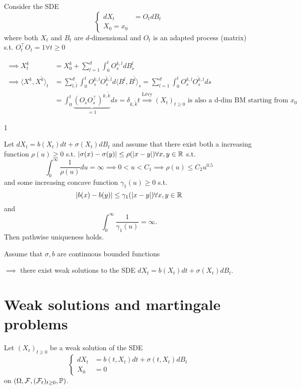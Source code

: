 \begin{example}\label{ex:1.11}
    Consider the SDE 
    \[\begin{cases}
        dX_t&=O_tdB_t\\
        X_0=x_0
    \end{cases}\]
    where both $X_t$ and $B_t$ are $d$-dimensional and 
    $O_t$ is an adapted process (matrix) s.t. $O_t^\intercal O_t=1\forall t\geq 0$

    \begin{align*}
        \implies X_t^k& = X_0^k+\sum_{l=1}^d\int_0^t O_s^{k,l}dB_s^l\\
        \implies \langle X^k,X^{\tilde{k}}\rangle_t&=\sum_{l,\tilde{l}}^d\int_0^tO_s^{k,l}O_s^{\tilde{k},\tilde{l}}d\langle B^l,B^{\tilde{l}}\rangle_s=\sum_{l=1}^d\int_0^t O_s^{k,l}O_s^{\tilde{k},l}ds \\
        &=\int_0^t \underbrace{\left(O_sO_s^\intercal\right)^{k,\tilde{k}}}_{=1}ds=\delta_{k,\tilde{k}}t\stackrel{\text{Lévy}}{\implies} (X_t)_{t\geq 0} \text{ is also a d-dim BM starting from } x_0
    \end{align*}

\end{example}
1
\begin{theorem}\label{thm:1.12}
    Let $dX_t=b(X_t)dt+\sigma(X_t)dB_t$ 
    and assume that there exist both a increasing function $\rho(u)\geq 0$ s.t. $|\sigma(x)-\sigma(y)|\leq \rho(|x-y|)\forall x,y\in\mathbb{R}$
    s.t. 
    \[\int_0^\infty \frac{1}{\rho(u)}du=\infty\implies 0<u<C_1\implies \rho(u)\leq C_2 u^{0.5}\]
    and some increasing concave function $\gamma_1(u)\geq 0$ s.t. 
    \[|b(x)-b(y)|\leq \gamma_1(|x-y|)\forall x,y\in\mathbb{R}\] and 
    \[\int_0^\infty\frac{1}{\gamma_1(u)}=\infty.\]
    Then pathwise uniqueness holds.
\end{theorem}

\begin{theorem}[Storokhod]\label{thm::1.13-storokhod}
    Assume that $\sigma,b$ are continuous bounded functions 
    
    $\implies$ there exist weak solutions to the SDE $dX_t=b(X_t)dt+\sigma(X_t)dB_t$.
\end{theorem}

\section{Weak solutions and martingale problems}

Let $(X_t)_{t\geq 0}$ be a weak solution of the SDE \[\begin{cases}
    dX_t&=b(t,X_t)dt+\sigma(t,X_t)dB_t\\X_0&=0
\end{cases}\]
on $(\Omega,\mathcal{F},(\mathcal{F}_t)_{t\geq 0},\mathbb{P})$. 

